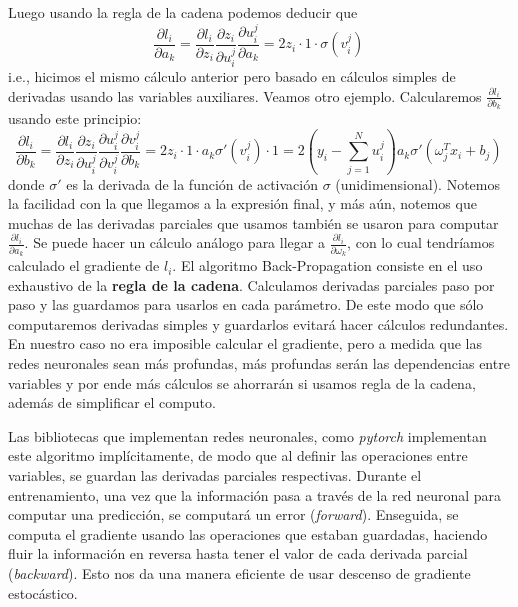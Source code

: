\documentclass[letterpaper,11pt]{article} %
\theoremstyle{defbreak}
\theoremstyle{propbreak}
\theoremstyle{remark}
\theoremstyle{break}
\begin{document}
Luego usando la regla de la cadena podemos deducir que
$$ \frac{\partial l_i}{\partial a_k} = \frac{\partial l_i}{\partial z_i}\frac{\partial z_i}{\partial u_i^j}\frac{\partial u_i^j}{\partial a_k} = 2z_i \cdot 1 \cdot \sigma(v_i^j) \,$$
i.e., hicimos el mismo cálculo anterior pero basado en cálculos simples de derivadas usando las variables auxiliares. Veamos otro ejemplo. Calcularemos $\frac{\partial l_i}{\partial b_k}$ usando este principio:
$$ \frac{\partial l_i}{\partial b_k} = \frac{\partial l_i}{\partial z_i}\frac{\partial z_i}{\partial u_i^j}\frac{\partial u_i^j}{\partial v_i^j}\frac{\partial v_i^j}{\partial b_k} = 2z_i \cdot 1 \cdot a_k\sigma'(v_i^j)\cdot 1 = 2 (y_i-\sum^N_{j=1}u_i^j)a_k\sigma'(\omega^T_j x_i+b_j) \,$$
donde $\sigma'$ es la derivada de la función de activación $\sigma$ (unidimensional). \newp Notemos la facilidad con la que llegamos a la expresión final, y más aún, notemos que muchas de las derivadas parciales que usamos también se usaron para computar $\frac{\partial l_i}{\partial a_k}$. Se puede hacer un cálculo análogo para llegar a $\frac{\partial l_i}{\partial \omega_k}$, con lo cual tendríamos calculado el gradiente de $l_i$. 
\newp El algoritmo Back-Propagation consiste en el uso exhaustivo de la \textbf{regla de la cadena}. Calculamos derivadas parciales paso por paso y las guardamos para usarlos en cada parámetro. De este modo que sólo computaremos derivadas simples y guardarlos evitará hacer cálculos redundantes. %
En nuestro caso no era imposible calcular el gradiente, pero a medida que las redes neuronales sean más profundas, más profundas serán las dependencias entre variables y por ende más cálculos se ahorrarán si usamos regla de la cadena, además de simplificar el computo.

\newp Las bibliotecas que implementan redes neuronales, como \textit{pytorch} implementan este algoritmo implícitamente, de modo que al definir las operaciones entre variables, se guardan las derivadas parciales respectivas. Durante el entrenamiento, una vez que la información pasa a través de la red neuronal para computar una predicción, se computará un error (\textit{forward}). Enseguida, se computa el gradiente usando las operaciones que estaban guardadas, haciendo fluir la información en reversa hasta tener el valor de cada derivada parcial (\textit{backward}). Esto nos da una manera eficiente de usar descenso de gradiente estocástico.
\end{document}
